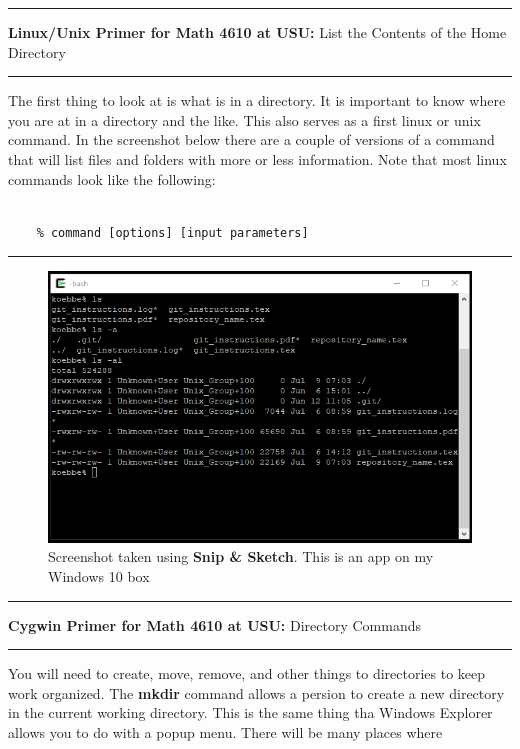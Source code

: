 \documentclass[10pt,fleqn]{article}
\begin{document}
\vskip0.1in\hrule\vskip0.1in
\noindent
{{\bf Linux/Unix Primer for Math 4610 at USU:} List the Contents of the Home
    Directory} 
\vskip0.1in\hrule\vskip0.1in
\noindent
The first thing to look at is what is in a directory. It is important to know
where you are at in a directory and the like. This also serves as a first linux
or unix command. In the screenshot below there are a couple of versions of a
command that will list files and folders with more or less information. Note
that most linux commands look like the following:
\begin{verbatim}

    % command [options] [input parameters]

\end{verbatim}
\vskip0.1in\hrule\vskip0.1in
\vfill
\begin{figure}[h]
\centering
\includegraphics{../images/cygwin_02.png}
\caption{{Screenshot} taken using {\bf Snip \& Sketch}. This is an app on
         my Windows 10 box}
\end{figure}
\eject
\vskip0.1in\hrule\vskip0.1in
\noindent
{{\bf Cygwin Primer for Math 4610 at USU:} Directory Commands} 
\vskip0.1in\hrule\vskip0.1in
\noindent
You will need to create, move, remove, and other things to directories to keep
work organized. The {\bf mkdir} command allows a persion to create a new
directory in the current working directory. This is the same thing tha Windows
Explorer allows you to do with a popup menu. There will be many places where
\end{document}
